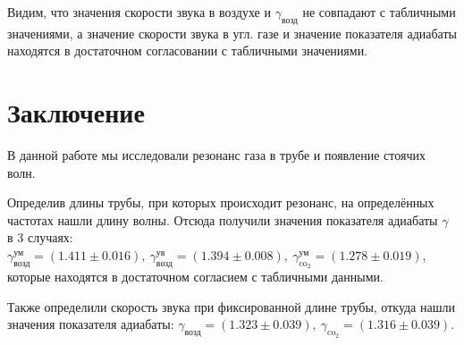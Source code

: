 \documentclass[a4paper,12pt]{article}
\begin{document}
Видим, что значения скорости звука в воздухе и $\gamma_{\text{возд}}$ не совпадают с табличными значениями, а значение скорости звука в угл. газе и значение показателя адиабаты находятся в достаточном согласовании с табличными значениями.

\section{Заключение}
В данной работе мы исследовали резонанс газа в трубе и появление стоячих волн.

Определив длины трубы, при которых происходит резонанс, на определённых частотах нашли длину волны. Отсюда получили значения показателя адиабаты $\gamma$ в 3 случаях: $\gamma_{\text{возд}}^{\text{ум}}=(1.411\pm0.016),\ \gamma_{\text{возд}}^{\text{ув}}=(1.394\pm0.008),\ \gamma_{\text{co$_2$}}^{\text{ум}}=(1.278\pm0.019)$, которые находятся в достаточном согласием с табличными данными.

Также определили скорость звука при фиксированной длине трубы, откуда нашли значения показателя адиабаты: $\gamma_{\text{возд}}=(1.323\pm0.039),\ \gamma_{\text{co$_2$}}=(1.316\pm0.039)$.


\end{document}
